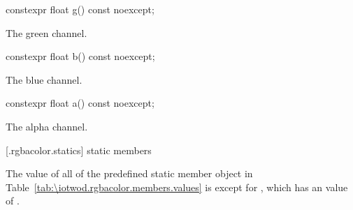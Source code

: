 %
\begin{itemdecl}
constexpr float g() const noexcept;
\end{itemdecl}
\begin{itemdescr}
\pnum
\returns
The green channel.
\end{itemdescr}

%
\begin{itemdecl}
constexpr float b() const noexcept;
\end{itemdecl}
\begin{itemdescr}
\pnum
\returns
The blue channel.
\end{itemdescr}

%
\begin{itemdecl}
constexpr float a() const noexcept;
\end{itemdecl}
\begin{itemdescr}
\pnum
\returns
The alpha channel.
\end{itemdescr}

 [\iotwod.rgbacolor.statics] { static members}

\pnum
The  value of all of the predefined  static member object in Table~\ref{tab:\iotwod.rgbacolor.members.values} is  except for , which has an  value of .

